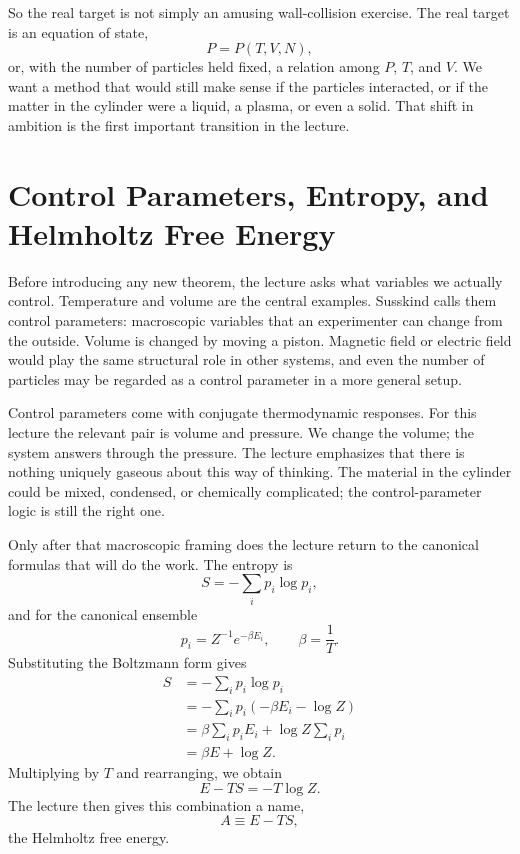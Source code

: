 So the real target is not simply an amusing wall-collision exercise. The real target is an equation of state,
\begin{equation}
P=P(T,V,N),
\end{equation}
or, with the number of particles held fixed, a relation among \(P\), \(T\), and \(V\). We want a method that would still make sense if the particles interacted, or if the matter in the cylinder were a liquid, a plasma, or even a solid. That shift in ambition is the first important transition in the lecture.

\section{Control Parameters, Entropy, and Helmholtz Free Energy}

Before introducing any new theorem, the lecture asks what variables we actually control. Temperature and volume are the central examples. Susskind calls them control parameters: macroscopic variables that an experimenter can change from the outside. Volume is changed by moving a piston. Magnetic field or electric field would play the same structural role in other systems, and even the number of particles may be regarded as a control parameter in a more general setup.

Control parameters come with conjugate thermodynamic responses. For this lecture the relevant pair is volume and pressure. We change the volume; the system answers through the pressure. The lecture emphasizes that there is nothing uniquely gaseous about this way of thinking. The material in the cylinder could be mixed, condensed, or chemically complicated; the control-parameter logic is still the right one.

Only after that macroscopic framing does the lecture return to the canonical formulas that will do the work. The entropy is
\begin{equation}
S=-\sum_i p_i\log p_i,
\end{equation}
and for the canonical ensemble
\begin{equation}
p_i=Z^{-1}e^{-\beta E_i},
\qquad
\beta=\frac{1}{T}.
\end{equation}
Substituting the Boltzmann form gives
\begin{align}
S
&=
-\sum_i p_i\log p_i \\
&=
-\sum_i p_i\left(-\beta E_i-\log Z\right) \\
&=
\beta\sum_i p_iE_i+\log Z\sum_i p_i \\
&=
\beta E+\log Z.
\end{align}
Multiplying by \(T\) and rearranging, we obtain
\begin{equation}
E-TS=-T\log Z.
\end{equation}
The lecture then gives this combination a name,
\begin{equation}
A\equiv E-TS,
\end{equation}
the Helmholtz free energy.

